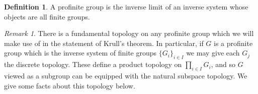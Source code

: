 \documentclass{article}
\theoremstyle{definition}
\newtheorem{definition}[theorem]{Definition}
\theoremstyle{remark}
\newtheorem*{remark}{Remark}
\begin{document}
\begin{definition}
	A profinite group is the inverse limit of an inverse system whose objects are all finite groups.
\end{definition}

\begin{remark}
	There is a fundamental topology on any profinite group which we will make use of in the statement of Krull's theorem.
	In particular, if $G$ is a profinite group which is the inverse system of finite groups $\{G_i\}_{i \in I}$ we may give each $G_j$ the discrete topology.
	These define a product topology on $\prod_{i \in I} G_i$, and so $G$ viewed as a subgroup can be equipped with the natural subspace topology.
	We give some facts about this topology below.
\end{remark}
	
\end{document}
